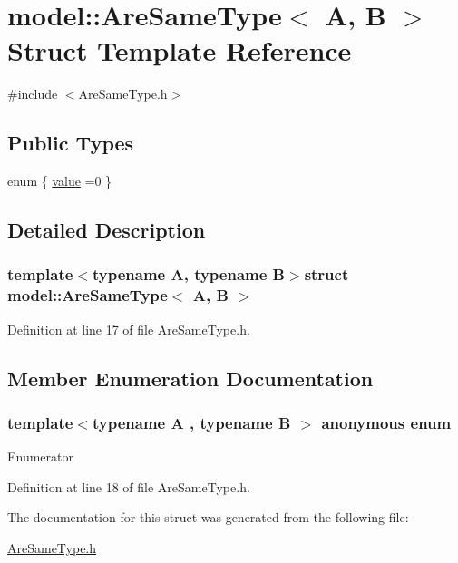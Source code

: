 \hypertarget{structmodel_1_1_are_same_type}{}\section{model\+:\+:Are\+Same\+Type$<$ A, B $>$ Struct Template Reference}
\label{structmodel_1_1_are_same_type}


{\ttfamily \#include $<$Are\+Same\+Type.\+h$>$}

\subsection*{Public Types}
\begin{DoxyCompactItemize}
\item 
enum \{ \hyperlink{structmodel_1_1_are_same_type_a958cd04cf20c207f8b38707966b778e0a4a8adbbea379e34f4fde092b44370ab5}{value} =0
 \}
\end{DoxyCompactItemize}


\subsection{Detailed Description}
\subsubsection*{template$<$typename A, typename B$>$struct model\+::\+Are\+Same\+Type$<$ A, B $>$}



Definition at line 17 of file Are\+Same\+Type.\+h.



\subsection{Member Enumeration Documentation}
\hypertarget{structmodel_1_1_are_same_type_a958cd04cf20c207f8b38707966b778e0}{}\subsubsection[{anonymous enum}]{\setlength{\rightskip}{0pt plus 5cm}template$<$typename A , typename B $>$ anonymous enum}\label{structmodel_1_1_are_same_type_a958cd04cf20c207f8b38707966b778e0}
\begin{Desc}
\item[Enumerator]\par
\begin{description}
\item[{\em 
\hypertarget{structmodel_1_1_are_same_type_a958cd04cf20c207f8b38707966b778e0a4a8adbbea379e34f4fde092b44370ab5}{}value\label{structmodel_1_1_are_same_type_a958cd04cf20c207f8b38707966b778e0a4a8adbbea379e34f4fde092b44370ab5}
}]\end{description}
\end{Desc}


Definition at line 18 of file Are\+Same\+Type.\+h.



The documentation for this struct was generated from the following file\+:\begin{DoxyCompactItemize}
\item 
\hyperlink{_are_same_type_8h}{Are\+Same\+Type.\+h}\end{DoxyCompactItemize}
